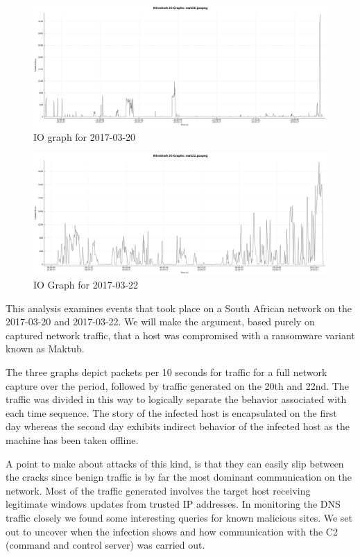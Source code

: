 \documentclass[11pt]{diazessay} %
\begin{document}
\begin{figure}[H]
        \centering
        \includegraphics[scale=0.30]{mak20.png}
    \caption{IO graph for 2017-03-20} 
\end{figure}

\begin{figure}[H]
        \centering
        \includegraphics[scale=0.30]{mak22.png}
    \caption{IO Graph for 2017-03-22}
\end{figure}

This analysis examines events that took place on a South African network on the 2017-03-20 and 2017-03-22. We will make the argument, based purely on captured network traffic, that a host was compromised with a ransomware variant known as Maktub. 

The three graphs depict packets per 10 seconds for traffic for a full network capture over the period, followed by traffic generated on the 20th and 22nd. The traffic was divided in this way to logically separate the behavior associated with each time sequence. The story of the infected host is encapsulated on the first day whereas the second day exhibits indirect behavior of the infected host as the machine has been taken offline.  

A point to make about attacks of this kind, is that they can easily slip between the cracks since benign traffic is by far the most dominant communication on the network. Most of the traffic generated involves the target host receiving legitimate windows updates from trusted IP addresses. In monitoring the DNS traffic closely we found some interesting queries for known malicious sites. We set out to uncover when the infection shows and how communication with the C2 (command and control server) was carried out.
\end{document}
